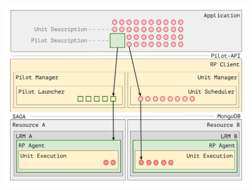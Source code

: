 \documentclass[landscape,a0paper,fontscale=0.285]{baposter} %
\newcommand{\compresslist}{ %
\setlength{\itemsep}{1pt}
\setlength{\parskip}{0pt}
\setlength{\parsep}{0pt}
}
\begin{document}
\begin{poster}
{\begin{center}
\includegraphics[width=0.7\linewidth]{rp_arch}
\end{center}









}



\end{poster}
\end{document}
